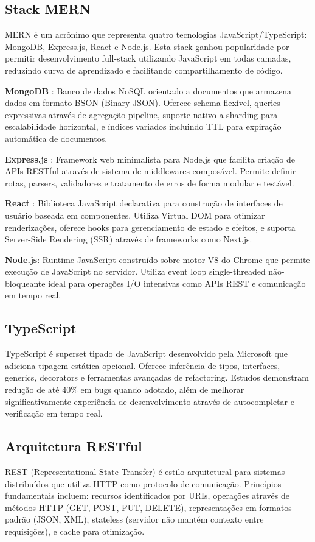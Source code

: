 \documentclass[conference]{IEEEtran}
\begin{document}
\subsection{Stack MERN}
MERN é um acrônimo que representa quatro tecnologias JavaScript/TypeScript: MongoDB, Express.js, React e Node.js. Esta stack ganhou popularidade por permitir desenvolvimento full-stack utilizando JavaScript em todas camadas, reduzindo curva de aprendizado e facilitando compartilhamento de código.

\textbf{MongoDB} \cite{mongodb:2024}: Banco de dados NoSQL orientado a documentos que armazena dados em formato BSON (Binary JSON). Oferece schema flexível, queries expressivas através de agregação pipeline, suporte nativo a sharding para escalabilidade horizontal, e índices variados incluindo TTL para expiração automática de documentos.

\textbf{Express.js} \cite{express:2024}: Framework web minimalista para Node.js que facilita criação de APIs RESTful através de sistema de middlewares composável. Permite definir rotas, parsers, validadores e tratamento de erros de forma modular e testável.

\textbf{React} \cite{react:2024}: Biblioteca JavaScript declarativa para construção de interfaces de usuário baseada em componentes. Utiliza Virtual DOM para otimizar renderizações, oferece hooks para gerenciamento de estado e efeitos, e suporta Server-Side Rendering (SSR) através de frameworks como Next.js.

\textbf{Node.js}: Runtime JavaScript construído sobre motor V8 do Chrome que permite execução de JavaScript no servidor. Utiliza event loop single-threaded não-bloqueante ideal para operações I/O intensivas como APIs REST e comunicação em tempo real.

\subsection{TypeScript}
TypeScript é superset tipado de JavaScript desenvolvido pela Microsoft que adiciona tipagem estática opcional. Oferece inferência de tipos, interfaces, generics, decorators e ferramentas avançadas de refactoring. Estudos demonstram redução de até 40\% em bugs quando adotado, além de melhorar significativamente experiência de desenvolvimento através de autocompletar e verificação em tempo real.

\subsection{Arquitetura RESTful}
REST (Representational State Transfer) é estilo arquitetural para sistemas distribuídos que utiliza HTTP como protocolo de comunicação. Princípios fundamentais incluem: recursos identificados por URIs, operações através de métodos HTTP (GET, POST, PUT, DELETE), representações em formatos padrão (JSON, XML), stateless (servidor não mantém contexto entre requisições), e cache para otimização.
\end{document}
